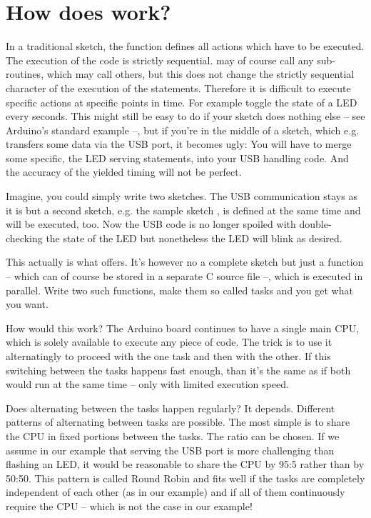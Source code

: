 \chapter{How does \rtos{} work?}

In a traditional sketch, the function  defines all actions
which have to be executed. The execution of the code is strictly
sequential.  may of course call any sub-routines, which may
call others, but this does not change the strictly sequential character of
the execution of the statements. Therefore it is difficult to execute
specific actions at specific points in time. For example toggle the state
of a LED every seconds. This might still be easy to do if your sketch does
nothing else -- see Arduino's standard example  --, but if
you're in the middle of a sketch, which e.g. transfers some data via the
USB port, it becomes ugly: You will have to merge some specific, the LED
serving statements, into your USB handling code. And the accuracy of the
yielded timing will not be perfect.

Imagine, you could simply write two sketches. The USB communication stays
as it is but a second sketch, e.g. the sample sketch , is
defined at the same time and will be executed, too. Now the USB code is no
longer spoiled with double-checking the state of the LED but nonetheless
the LED will blink as desired.

This actually is what \rtos{} offers. It's however no a complete sketch
but just a function -- which can of course be stored in a separate C
source file --, which is executed in parallel. Write two such functions,
make them so called tasks and you get what you want.

How would this work? The Arduino board continues to have a single main
CPU, which is solely available to execute any piece of code. The trick is
to use it alternatingly to proceed with the one task and then with the
other. If this switching between the tasks happens fast enough, than it's
the same as if both would run at the same time -- only with limited
execution speed.

Does alternating between the tasks happen regularly? It depends. Different
patterns of alternating between tasks are possible. The most simple is to
share the CPU in fixed portions between the tasks. The ratio can be
chosen. If we assume in our example that serving the USB port is more
challenging than flashing an LED, it would be reasonable to share the CPU
by 95:5 rather than by 50:50. This pattern is called Round Robin and fits
well if the tasks are completely independent of each other (as in our
example) and if all of them continuously require the CPU -- which is not
the case in our example!

